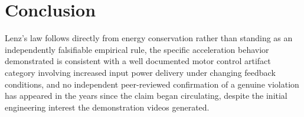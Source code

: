 \documentclass[11pt]{article}
\begin{document}
\section{Conclusion}

Lenz's law follows directly from energy conservation rather than standing as an independently falsifiable empirical rule, the specific acceleration behavior demonstrated is consistent with a well documented motor control artifact category involving increased input power delivery under changing feedback conditions, and no independent peer-reviewed confirmation of a genuine violation has appeared in the years since the claim began circulating, despite the initial engineering interest the demonstration videos generated.
\end{document}
